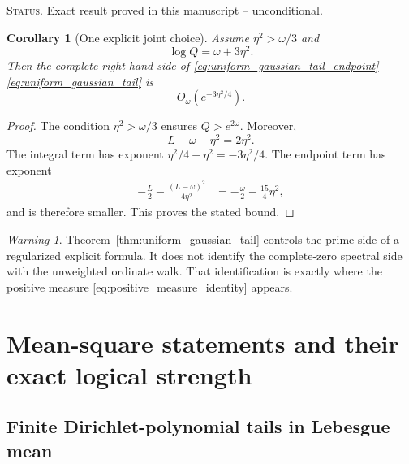\documentclass[11pt]{amsart}
\numberwithin{equation}{section}
\theoremstyle{plain}
\newtheorem{corollary}[theorem]{Corollary}
\theoremstyle{definition}
\theoremstyle{remark}
\newtheorem{warning}[theorem]{Warning}
\newcommand{\1}{\mathbf{1}}
\newcommand{\statusnote}[1]{%
  \par\smallskip\noindent
  \begingroup\footnotesize\textsc{Status.} #1\endgroup
  \par\smallskip}
\begin{document}
\statusnote{Exact result proved in this manuscript -- unconditional.}
\begin{corollary}[One explicit joint choice]
\label{cor:joint_Q_eta_choice}
Assume \(\eta^2>\omega/3\) and
\begin{equation}
\log Q=\omega+3\eta^2.
\label{eq:joint_Q_eta_choice}
\end{equation}
Then the complete right-hand side of
\eqref{eq:uniform_gaussian_tail_endpoint}--
\eqref{eq:uniform_gaussian_tail} is
\begin{equation}
O_\omega(e^{-3\eta^2/4}).
\label{eq:joint_Q_eta_decay}
\end{equation}
\end{corollary}

\begin{proof}
The condition \(\eta^2>\omega/3\) ensures \(Q>e^{2\omega}\).  Moreover,
\begin{equation}
L-\omega-\eta^2=2\eta^2.
\label{eq:joint_choice_r}
\end{equation}
The integral term has exponent
\(\eta^2/4-\eta^2=-3\eta^2/4\).  The endpoint term has exponent
\begin{align}
-\frac L2-\frac{(L-\omega)^2}{4\eta^2}
&=
-\frac\omega2-\frac{15}{4}\eta^2,
\label{eq:joint_choice_endpoint_exponent}
\end{align}
and is therefore smaller.  This proves the stated bound.
\end{proof}

\begin{warning}
\label{warn:regularized_tail_not_ordinate_formula}
Theorem~\ref{thm:uniform_gaussian_tail} controls the prime side of a
regularized explicit formula.  It does not identify the complete-zero
spectral side with the unweighted ordinate walk.  That identification is
exactly where the positive measure \eqref{eq:positive_measure_identity}
appears.
\end{warning}

\section{Mean-square statements and their exact logical strength}
\label{sec:mean_square_logic}

\subsection{Finite Dirichlet-polynomial tails in Lebesgue mean}
\label{subsec:finite_dirichlet_mean}
\end{document}
